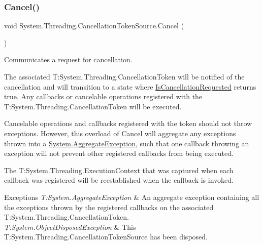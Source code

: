 \subsubsection{\texorpdfstring{Cancel()}{Cancel()}\hspace{0.1cm}{\footnotesize\ttfamily [1/2]}}
{\footnotesize\ttfamily void System.\+Threading.\+Cancellation\+Token\+Source.\+Cancel (\begin{DoxyParamCaption}{ }\end{DoxyParamCaption})\hspace{0.3cm}{\ttfamily [inline]}}



Communicates a request for cancellation. 

The associated T\+:\+System.\+Threading.\+Cancellation\+Token will be notified of the cancellation and will transition to a state where \hyperlink{struct_system_1_1_threading_1_1_cancellation_token_a1b0338d63f9b268339e7348629301748}{Is\+Cancellation\+Requested} returns true. Any callbacks or cancelable operations registered with the T\+:\+System.\+Threading.\+Cancellation\+Token will be executed. 

Cancelable operations and callbacks registered with the token should not throw exceptions. However, this overload of Cancel will aggregate any exceptions thrown into a \hyperlink{class_system_1_1_aggregate_exception}{System.\+Aggregate\+Exception}, such that one callback throwing an exception will not prevent other registered callbacks from being executed. 

The T\+:\+System.\+Threading.\+Execution\+Context that was captured when each callback was registered will be reestablished when the callback is invoked. 


\begin{DoxyExceptions}{Exceptions}
{\em T\+:\+System.\+Aggregate\+Exception} & An aggregate exception containing all the exceptions thrown by the registered callbacks on the associated T\+:\+System.\+Threading.\+Cancellation\+Token.\\
\hline
{\em T\+:\+System.\+Object\+Disposed\+Exception} & This T\+:\+System.\+Threading.\+Cancellation\+Token\+Source has been disposed.\\
\hline
\end{DoxyExceptions}
\mbox{\label{class_system_1_1_threading_1_1_cancellation_token_source_ad4f13dc56fb7ff4633c5059d2870b34b}} 
